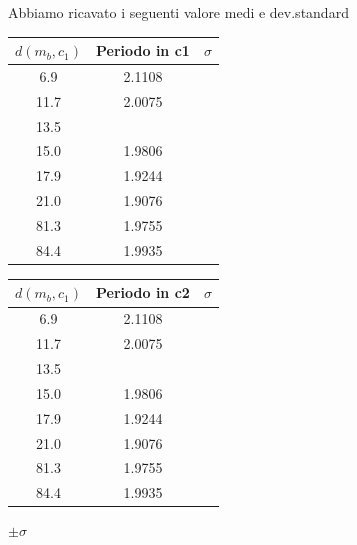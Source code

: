 \documentclass[a4paper,10pt]{report}
\begin{document}
Abbiamo ricavato i seguenti valore medi e dev.standard 
\begin{tabular}{|c|c|c|}
$d(m_b,c_1)$ & Periodo in c1 & $\sigma$ \\
\midrule
6.9 & 2.1108 &\\
11.7 & 2.0075 &\\
13.5 & &\\
15.0 &  1.9806 &\\
17.9 & 1.9244 &\\
21.0 & 1.9076 &\\
81.3 & 1.9755&\\
84.4 & 1.9935&\\
\end{tabular}

\begin{tabular}{|c|c|c|}
$d(m_b,c_1)$ & Periodo in c2 & $\sigma$ \\
\midrule
6.9 & 2.1108 &\\
11.7 & 2.0075 &\\
13.5 & &\\
15.0 &  1.9806 &\\
17.9 & 1.9244 &\\
21.0 & 1.9076 &\\
81.3 & 1.9755&\\
84.4 & 1.9935&\\
\end{tabular}

$\pm\sigma$
\end{document}
